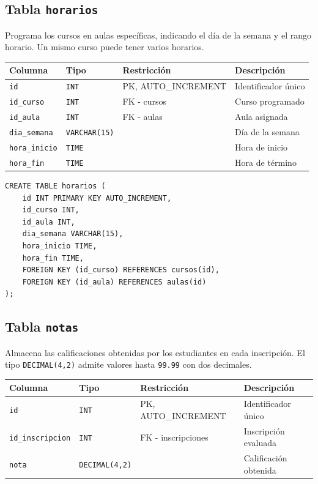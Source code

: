\documentclass[12pt,a4paper]{article}
\begin{document}
\subsection{Tabla \texttt{horarios}}
 
Programa los cursos en aulas específicas, indicando el día de la
semana y el rango horario. Un mismo curso puede tener varios horarios.
 
\begin{center}
\begin{tabular}{llll}
  \hline
  \textbf{Columna} & \textbf{Tipo} & \textbf{Restricción} & \textbf{Descripción} \\
  \hline
  \texttt{id}           & \texttt{INT}          & PK, AUTO\_INCREMENT & Identificador único \\
  \texttt{id\_curso}    & \texttt{INT}          & FK - cursos        & Curso programado \\
  \texttt{id\_aula}     & \texttt{INT}          & FK - aulas         & Aula asignada \\
  \texttt{dia\_semana}  & \texttt{VARCHAR(15)}  &                     & Día de la semana \\
  \texttt{hora\_inicio} & \texttt{TIME}         &                     & Hora de inicio \\
  \texttt{hora\_fin}    & \texttt{TIME}         &                     & Hora de término \\
  \hline
\end{tabular}
\end{center}
 
\begin{lstlisting}[caption={SQL -- horarios}]
CREATE TABLE horarios (
    id INT PRIMARY KEY AUTO_INCREMENT,
    id_curso INT,
    id_aula INT,
    dia_semana VARCHAR(15),
    hora_inicio TIME,
    hora_fin TIME,
    FOREIGN KEY (id_curso) REFERENCES cursos(id),
    FOREIGN KEY (id_aula) REFERENCES aulas(id)
);
\end{lstlisting}
 
\subsection{Tabla \texttt{notas}}
 
Almacena las calificaciones obtenidas por los estudiantes en cada
inscripción. El tipo \texttt{DECIMAL(4,2)} admite valores hasta
\texttt{99.99} con dos decimales.
 
\begin{center}
\begin{tabular}{llll}
  \hline
  \textbf{Columna} & \textbf{Tipo} & \textbf{Restricción} & \textbf{Descripción} \\
  \hline
  \texttt{id}               & \texttt{INT}          & PK, AUTO\_INCREMENT   & Identificador único \\
  \texttt{id\_inscripcion}  & \texttt{INT}          & FK - inscripciones   & Inscripción evaluada \\
  \texttt{nota}             & \texttt{DECIMAL(4,2)} &                       & Calificación obtenida \\
  \hline
\end{tabular}
\end{center}
 
\end{document}
